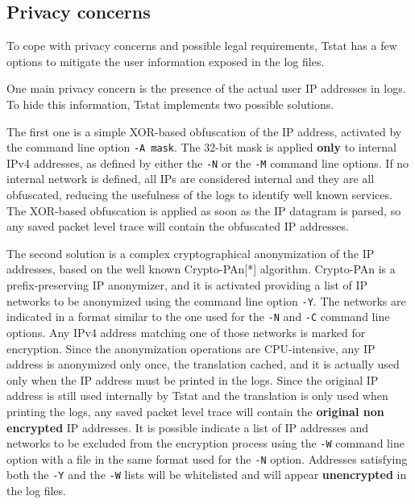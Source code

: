 \documentclass[11pt]{article}
\begin{document}
\subsection{Privacy concerns\label{Privacy_concerns}}


To cope with privacy concerns and possible legal requirements, Tstat has a few options
to mitigate the user information exposed in the log files.



One main privacy concern is the presence of the actual user IP addresses in logs.
To hide this information, Tstat implements two possible solutions.



The first one is a simple XOR-based obfuscation of the IP address, activated by the 
command line option \texttt{-A mask}. The 32-bit mask is applied \textbf{only} to internal IPv4 
addresses, as defined by either the \texttt{-N} or the \texttt{-M} command line options. If no 
internal network is defined, all IPs are considered internal and they are all 
obfuscated, reducing the usefulness of the logs to identify well known services.
The XOR-based obfuscation is applied as soon as the IP datagram is parsed, so
any saved packet level trace will contain the obfuscated IP addresses.



The second solution is a complex cryptographical anonymization of the IP addresses,
based on the well known Crypto-PAn[*] algorithm.
Crypto-PAn is a prefix-preserving IP anonymizer, and it is activated providing a 
list of IP networks to be anonymized using the command line option \texttt{-Y}. 
The networks are indicated in a format similar to the one used for the \texttt{-N} and \texttt{-C}
command line options. Any IPv4 address matching one of those networks is marked for 
encryption. Since the anonymization operations are CPU-intensive, any IP address 
is anonymized only once, the translation cached, and it is actually used only when the 
IP address must be printed in the logs. 
Since the original IP address is still used internally by Tstat and the translation is 
only used when printing the logs, any saved packet level trace will contain the 
\textbf{original non encrypted} IP addresses.
It is possible indicate a list of IP addresses and networks to be excluded from the 
encryption process using the \texttt{-W} command line option with a file in the same format 
used for the \texttt{-N} option. Addresses satisfying both the \texttt{-Y} and the \texttt{-W} lists 
will be whitelisted and will appear \textbf{unencrypted} in the log files.
\end{document}
